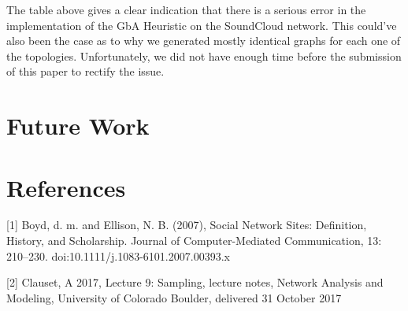 \documentclass{article}
\begin{document}
The table above gives a clear indication that there is a serious error in the implementation of the GbA Heuristic on the SoundCloud network.  This could've also been the case as to why we generated mostly identical graphs for each one of the topologies.  Unfortunately, we did not have enough time before the submission of this paper to rectify the issue.

\section{Future Work}

\section*{References}
\small

[1] Boyd, d. m. and Ellison, N. B. (2007), Social Network Sites: Definition, History, and Scholarship. Journal of Computer-Mediated Communication, 13: 210–230. doi:10.1111/j.1083-6101.2007.00393.x

[2] Clauset, A 2017, Lecture 9: Sampling, lecture notes, Network Analysis and Modeling, University of Colorado Boulder, delivered 31 October 2017
\end{document}
